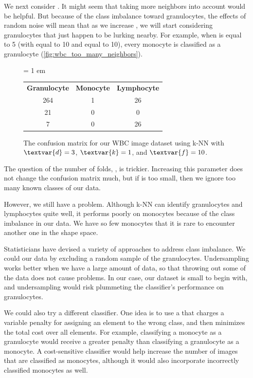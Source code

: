 We next consider . It might seem that taking more neighbors into account would be helpful. But because of the class imbalance toward granulocytes, the effects of random noise will mean that as we increase , we will start considering granulocytes that just happen to be lurking nearby. For example, when  is equal to 5 (with  equal to 10 and  equal to 10), every monocyte is classified as a granulocyte (\autoref{fig:wbc_too_many_neighbors}).\\

\begin{figure}[h]
\centering
\tabcolsep = 1 em
\mySfFamily
\begin{tabular}{c c c}
\textbf{Granulocyte} & \textbf{Monocyte} & \textbf{Lymphocyte} \\
264 & 1 & 26 \\
21 & 0 & 0 \\
7 & 0 & 26
\end{tabular}
\caption{The confusion matrix for our WBC image dataset using k-NN with $\textvar{d} = \text{3}$, $\textvar{k} = \text{1}$, and $\textvar{f} = \text{10}$.}
\label{fig:wbc_too_many_neighbors}
\end{figure}

The question of the number of folds, , is trickier. Increasing this parameter does not change the confusion matrix much, but if  is too small, then we ignore too many known classes of our data.

However, we still have a problem. Although k-NN can identify granulocytes and lymphocytes quite well, it performs poorly on monocytes because of the class imbalance in our data. We have so few monocytes that it is rare to encounter another one in the shape space.

Statisticians have devised a variety of approaches to address class imbalance. We could  our data by excluding a random sample of the granulocytes. Undersampling works better when we have a large amount of data, so that throwing out some of the data does not cause problems. In our case, our dataset is small to begin with, and undersampling would risk plummeting the classifier's performance on granulocytes.

We could also try a different classifier. One idea is to use a  that charges a variable penalty for assigning an element to the wrong class, and then minimizes the total cost over all elements. For example, classifying a monocyte as a granulocyte would receive a greater penalty than classifying a granulocyte as a monocyte. A cost-sensitive classifier would help increase the number of images that are classified as monocytes, although it would also incorporate incorrectly classified monocytes as well.

